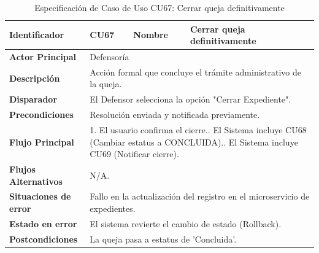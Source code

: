 \begingroup
\setlength{\parskip}{0pt}
\begin{longtable}{|p{3.5cm}|p{2cm}|p{2.5cm}|p{7cm}|}
\caption{Especificación de Caso de Uso CU67: Cerrar queja definitivamente}
\label{tab:cu67} \\
\hline
\textbf{Identificador} & CU67 & \textbf{Nombre} & Cerrar queja definitivamente \\ \hline
\textbf{Actor Principal} & \multicolumn{3}{p{11.5cm}|}{Defensoría} \\ \hline
\textbf{Descripción} & \multicolumn{3}{p{11.5cm}|}{Acción formal que concluye el trámite administrativo de la queja.} \\ \hline
\textbf{Disparador} & \multicolumn{3}{p{11.5cm}|}{El Defensor selecciona la opción "Cerrar Expediente".} \\ \hline
\textbf{Precondiciones} & \multicolumn{3}{p{11.5cm}|}{Resolución enviada y notificada previamente.} \\ \hline
\textbf{Flujo Principal} & \multicolumn{3}{p{11.5cm}|}{1. El usuario confirma el cierre.\newline 2. El Sistema incluye CU68 (Cambiar estatus a CONCLUIDA).\newline 3. El Sistema incluye CU69 (Notificar cierre).} \\ \hline
\textbf{Flujos Alternativos} & \multicolumn{3}{p{11.5cm}|}{N/A.} \\ \hline
\textbf{Situaciones de error} & \multicolumn{3}{p{11.5cm}|}{Fallo en la actualización del registro en el microservicio de expedientes.} \\ \hline
\textbf{Estado en error} & \multicolumn{3}{p{11.5cm}|}{El sistema revierte el cambio de estado (Rollback).} \\ \hline
\textbf{Postcondiciones} & \multicolumn{3}{p{11.5cm}|}{La queja pasa a estatus de 'Concluida'.} \\ \hline
\end{longtable}
\endgroup

\vspace{0.8cm}

